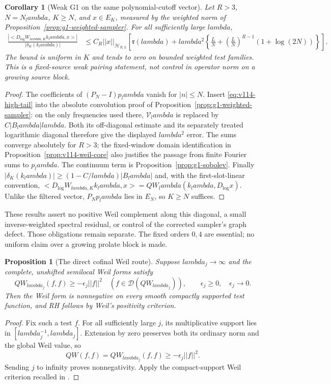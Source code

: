 \documentclass[11pt]{article}
\def\lambda{lambda}%
\def\norm#1{||#1||}%
\def\ip#1#2{<#1,#2>}%
\newtheorem{proposition}[theorem]{Proposition}
\newtheorem{corollary}[theorem]{Corollary}
\theoremstyle{remark}
\newcommand{\norm}[1]{\left\lVert #1\right\rVert}
\newcommand{\ip}[2]{\left\langle #1,#2\right\rangle}
\begin{document}
\begin{corollary}[Weak G1 on the same polynomial-cutoff vector]
\label{cor:v114-polynomial-g1}
Let $R>3$, $N=N_\lambda$, $K\ge N$, and $x\in E_K$, measured by
the weighted norm of Proposition~\ref{prop:g1-weighted-sampler}.
For all sufficiently large $\lambda$,
\begin{align}
 \frac{|\ip{D_{\log}W_{\lambda,K}k_\lambda}{x}|}
      {|\delta_K(k_\lambda)|}
 &\le C_R\norm x_{\mathcal H_{R,L}}
 \left[\mathfrak r(\lambda)+\lambda^2
 \left\{\frac LN+\left(\frac LN\right)^{R-1}
                   (1+\log(2N))\right\}\right].
 \label{eq:v114-polynomial-g1}
\end{align}
The bound is uniform in $K$ and tends to zero on bounded weighted test
families. This is a fixed-source weak pairing statement, not control
in operator norm on a growing source block.
\end{corollary}
\begin{proof}
The coefficients of $(P_N-I)p_\lambda$ vanish for $|n|\le N$.
Insert \eqref{eq:v114-high-tail} into the absolute convolution proof
of Proposition~\ref{prop:g1-weighted-sampler}: on the only frequencies
used there, $\mathcal V_\lambda$ is replaced by $C|B_\lambda|\lambda$.
Both its off-diagonal estimate and its separately treated logarithmic
diagonal therefore give the displayed $\lambda^2$ error. The sums
converge absolutely for $R>3$; the fixed-window domain identification
in Proposition~\ref{prop:v114-weil-core} also justifies the passage
from finite Fourier sums to $p_\lambda$.
The continuum term is Proposition~\ref{prop:g1-sobolev}. Finally
$|\delta_K(k_\lambda)|\ge(1-C/\lambda)|B_\lambda|$ and, with the
first-slot-linear convention,
$\ip{D_{\log}W_{\lambda,K}k_\lambda}{x}
=QW_\lambda(k_\lambda,D_{\log}x)$.
Unlike the filtered vector, $P_Np_\lambda$ lies in $E_N$, so $K\ge N$
suffices.
\end{proof}

These results assert no positive Weil complement along this diagonal,
a small inverse-weighted spectral residual, or control of the corrected
sampler's graph defect. Those obligations remain separate. The fixed
orders $0,4$ are essential; no uniform claim over a growing prolate block
is made.


\begin{proposition}[The direct cofinal Weil route]\label{prop:v121-cofinal-rh}
Suppose $\lambda_j\to\infty$ and the complete, unshifted semilocal
Weil forms satisfy
\[
 QW_{\lambda_j}(f,f)\ge-\epsilon_j\norm f^2
 \quad(f\in\mathcal D(QW_{\lambda_j})),
 \qquad \epsilon_j\ge0,\quad\epsilon_j\to0.
\]
Then the Weil form is nonnegative on every smooth compactly supported
test function, and RH follows by Weil's positivity criterion.
\end{proposition}
\begin{proof}
Fix such a test $f$. For all sufficiently large $j$, its multiplicative
support lies in $[\lambda_j^{-1},\lambda_j]$. Extension by zero
preserves both its ordinary norm and the global Weil value, so
\[
 QW(f,f)=QW_{\lambda_j}(f,f)\ge-\epsilon_j\norm f^2.
\]
Sending $j$ to infinity proves nonnegativity. Apply the compact-support
Weil criterion recalled in \cite{ConnesConsaniMoscovici2025}.
\end{proof}
\end{document}
